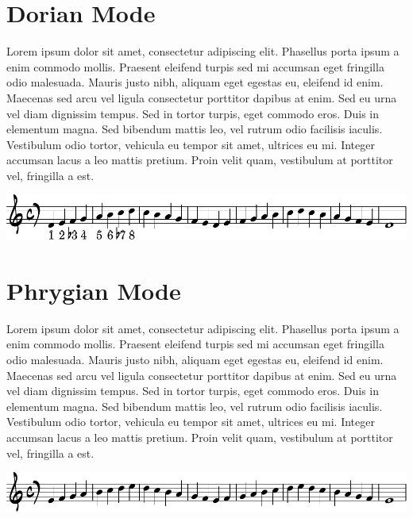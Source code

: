 \documentclass[11pt]{article}
\begin{document}
\section*{Dorian Mode}
\label{sec:org61a3666}

Lorem ipsum dolor sit amet, consectetur adipiscing elit. Phasellus
porta ipsum a enim commodo mollis. Praesent eleifend turpis sed mi
accumsan eget fringilla odio malesuada. Mauris justo nibh, aliquam
eget egestas eu, eleifend id enim. Maecenas sed arcu vel ligula
consectetur porttitor dapibus at enim. Sed eu urna vel diam dignissim
tempus. Sed in tortor turpis, eget commodo eros. Duis in elementum
magna. Sed bibendum mattis leo, vel rutrum odio facilisis iaculis.
Vestibulum odio tortor, vehicula eu tempor sit amet, ultrices eu mi.
Integer accumsan lacus a leo mattis pretium. Proin velit quam,
vestibulum at porttitor vel, fringilla a est.

\begin{center}
\includegraphics[width=.9\linewidth]{dorian.pdf}
\end{center}

\section*{Phrygian Mode}
\label{sec:org4923f95}

Lorem ipsum dolor sit amet, consectetur adipiscing elit. Phasellus
porta ipsum a enim commodo mollis. Praesent eleifend turpis sed mi
accumsan eget fringilla odio malesuada. Mauris justo nibh, aliquam
eget egestas eu, eleifend id enim. Maecenas sed arcu vel ligula
consectetur porttitor dapibus at enim. Sed eu urna vel diam dignissim
tempus. Sed in tortor turpis, eget commodo eros. Duis in elementum
magna. Sed bibendum mattis leo, vel rutrum odio facilisis iaculis.
Vestibulum odio tortor, vehicula eu tempor sit amet, ultrices eu mi.
Integer accumsan lacus a leo mattis pretium. Proin velit quam,
vestibulum at porttitor vel, fringilla a est.

\begin{center}
\includegraphics[width=.9\linewidth]{phrygian.pdf}
\end{center}
\end{document}
